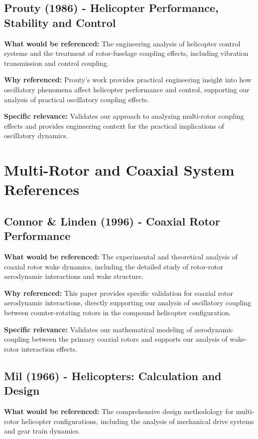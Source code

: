 \documentclass{article}
\begin{document}
\subsection{Prouty (1986) - Helicopter Performance, Stability and Control}

\textbf{What would be referenced:} The engineering analysis of helicopter control systems and the treatment of rotor-fuselage coupling effects, including vibration transmission and control coupling.

\textbf{Why referenced:} Prouty's work provides practical engineering insight into how oscillatory phenomena affect helicopter performance and control, supporting our analysis of practical oscillatory coupling effects.

\textbf{Specific relevance:} Validates our approach to analyzing multi-rotor coupling effects and provides engineering context for the practical implications of oscillatory dynamics.

\section{Multi-Rotor and Coaxial System References}

\subsection{Connor & Linden (1996) - Coaxial Rotor Performance}

\textbf{What would be referenced:} The experimental and theoretical analysis of coaxial rotor wake dynamics, including the detailed study of rotor-rotor aerodynamic interactions and wake structure.

\textbf{Why referenced:} This paper provides specific validation for coaxial rotor aerodynamic interactions, directly supporting our analysis of oscillatory coupling between counter-rotating rotors in the compound helicopter configuration.

\textbf{Specific relevance:} Validates our mathematical modeling of aerodynamic coupling between the primary coaxial rotors and supports our analysis of wake-rotor interaction effects.

\subsection{Mil (1966) - Helicopters: Calculation and Design}

\textbf{What would be referenced:} The comprehensive design methodology for multi-rotor helicopter configurations, including the analysis of mechanical drive systems and gear train dynamics.
\end{document}
